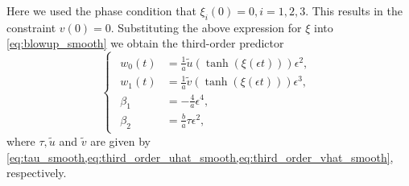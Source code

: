 Here we used the phase condition that $\xi_i(0)=0,i=1,2,3$. This results in the
constraint $v(0)=0$. Substituting the above expression for $\xi$ into
\cref{eq:blowup_smooth} we obtain the third-order predictor
\begin{equation}
\label{eq:third_order_predictor_LP_tau_smooth}
\begin{cases}
\begin{aligned}
w_0(t)  &= \frac{1}{a} \tilde{u}\left(\tanh\left(\xi(\epsilon t)\right)\right) \epsilon^2, \\
w_1(t)  &= \frac{1}{a} \tilde{v}\left(\tanh\left(\xi(\epsilon t)\right)\right) \epsilon^3, \\
\beta_1    &= -\frac{4}{a}\epsilon^4, \\
\beta_2    &= \frac{b}{a}\tau\epsilon^2,
\end{aligned}
\end{cases}
\end{equation}
where $\tau,\tilde{u}$ and $\tilde{v}$ are given by
\cref{eq:tau_smooth,eq:third_order_uhat_smooth,eq:third_order_vhat_smooth},
respectively.

